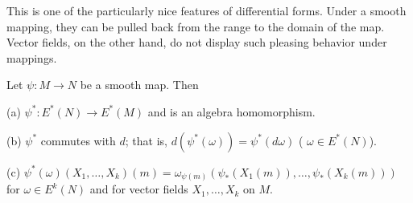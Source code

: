 This is one of the particularly nice features of differential forms. Under a smooth mapping, they can be pulled back from the range to the domain of the map. Vector fields, on the other hand, do not display such pleasing behavior under mappings.


\begin{proposition}\label{thm:2.23}
Let  $ \psi\colon M \to N $ be a smooth map. Then

(a)  $ \psi^{*}\colon E^{*}(N)\to E^{*}(M) $ and is an algebra homomorphism.

(b)  $ \psi^{*} $ commutes with  $ d $; that is,  $ d(\psi^{*}(\omega)) = \psi^{*}(d\omega) $ ( $ \omega \in E^*(N) $).

(c)  $ \psi^{*}(\omega)(X_1,\ldots,X_k)(m)=\omega_{\psi(m)}(\psi_{*}(X_1(m)),\ldots,\psi_{*}(X_k(m))) $ for  $ \omega\in E^k(N) $ and for vector fields  $ X_1,\ldots,X_k $ on  $ M $.

\end{proposition}

